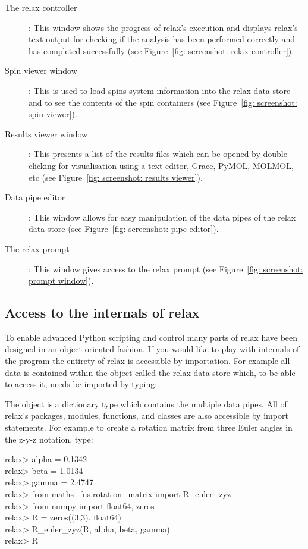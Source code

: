 \begin{description}
\item[The relax controller]:  This window shows the progress of relax's execution and displays relax's text output for checking if the analysis has been performed correctly and has completed successfully (see Figure~\ref{fig: screenshot: relax controller}).
\item[Spin viewer window]:  This is used to load spins system information into the relax data store and to see the contents of the spin containers (see Figure~\ref{fig: screenshot: spin viewer}).
\item[Results viewer window]:  This presents a list of the results files which can be opened by double clicking for visualisation using a text editor, Grace, PyMOL, MOLMOL, etc (see Figure~\ref{fig: screenshot: results viewer}).
\item[Data pipe editor]:  This window allows for easy manipulation of the data pipes of the relax data store (see Figure~\ref{fig: screenshot: pipe editor}).
\item[The relax prompt]:  This window gives access to the relax prompt (see Figure~\ref{fig: screenshot: prompt window}).
\end{description}




\subsection{Access to the internals of relax}

To enable advanced Python scripting and control many parts of relax have been designed in an object oriented fashion.  If you would like to play with internals of the program the entirety of relax is accessible by importation.  For example all data is contained within the object called the relax data store which, to be able to access it, needs be imported by typing:


The  object is a dictionary type which contains the multiple data pipes.  All of relax's packages, modules, functions, and classes are also accessible by import statements.  For example to create a rotation matrix from three Euler angles in the z-y-z notation, type:

\begin{exampleenv}
relax> alpha = 0.1342 \\
relax> beta = 1.0134 \\
relax> gamma = 2.4747 \\
relax> from maths\_fns.rotation\_matrix import R\_euler\_zyz \\
relax> from numpy import float64, zeros \\
relax> R = zeros((3,3), float64) \\
relax> R\_euler\_zyz(R, alpha, beta, gamma) \\
relax> R
\end{exampleenv}



